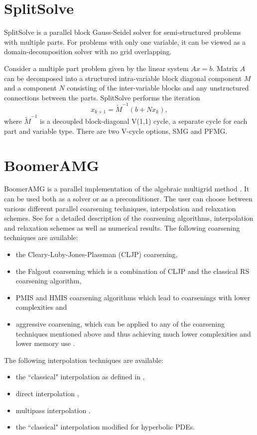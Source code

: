 \section{SplitSolve}
                                                                                                                                                             
SplitSolve is a parallel block Gauss-Seidel solver for semi-structured
problems with multiple parts. For problems with only one variable, it can be viewed as 
a domain-decomposition solver with no grid overlapping.

Consider a multiple part problem given by the linear system $Ax=b$. Matrix $A$ can
be decomposed into a structured intra-variable block diagonal component $M$ and a
component $N$ consisting of the inter-variable blocks and any unstructured connections
between the parts. SplitSolve performs the iteration 
\[ x_{k+1} = \tilde{M}^{-1} (b + N x_k),\]
where $\tilde{M}^{-1}$ is a decoupled block-diagonal V(1,1) cycle, a separate cycle for each
part and variable type. There are two V-cycle options, SMG and PFMG.

\section{BoomerAMG}

BoomerAMG is a parallel implementation of the algebraic multigrid 
method \cite{Ruge_Stueben_1987}. 
It can be used
both as a solver or as a preconditioner.  The user can choose between various
different parallel coarsening techniques, interpolation and relaxation schemes.
See
\cite{VEHenson_UMYang_2002,UMYang_2005} for a detailed description of the 
coarsening
algorithms, interpolation and relaxation schemes as well as numerical results.  The following
coarsening techniques are available:
\begin{itemize}
\item the Cleary-Luby-Jones-Plassman (CLJP) coarsening,
\item the Falgout coarsening which is a combination of CLJP and the
classical RS coarsening algorithm,
\item PMIS and HMIS coarsening algorithms which lead to coarsenings with lower complexities \cite{DeSterck_Yang_Heys_2004}
and 
\item aggressive coarsening, which can be applied to any of the coarsening techniques mentioned above and thus achieving much lower complexities and lower memory use \cite{Stueben_1999}.
\end{itemize}
The following interpolation techniques are available:
\begin{itemize}
\item the ``classical" interpolation as defined in \cite{Ruge_Stueben_1987},
\item direct interpolation \cite{Stueben_1999},
\item multipass interpolation \cite{Stueben_1999}.
\item the ``classical" interpolation modified for hyperbolic PDEs.
\end{itemize}

